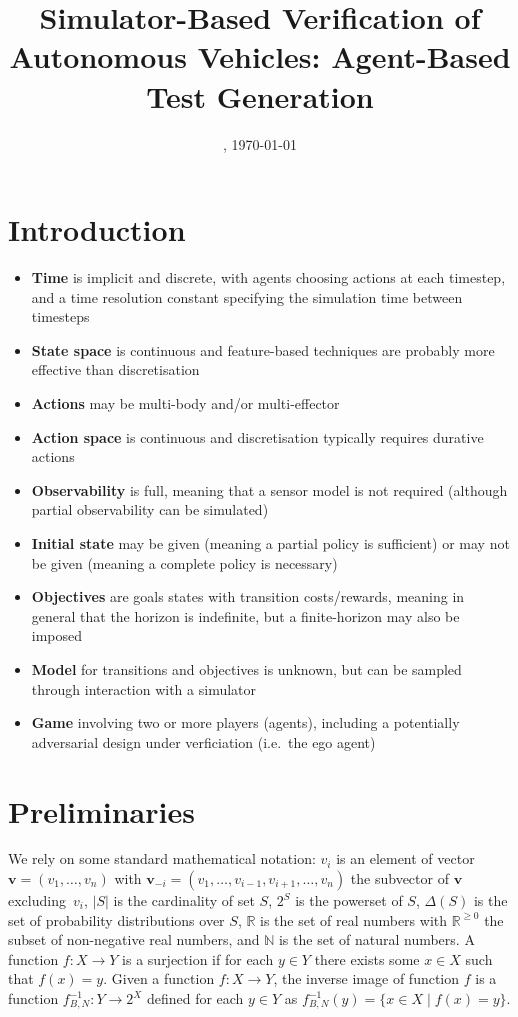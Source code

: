 \documentclass[10pt]{article}
\title{Simulator-Based Verification of Autonomous Vehicles: Agent-Based Test Generation}
\author{}
\date{\DTMcurrenttime, \today}
\theoremstyle{plain}
\newcommand{\vect}[1]{\bm{#1}}
\begin{document}
\maketitle

\section{Introduction}

\begin{itemize}
    \item \textbf{Time} is implicit and discrete, with agents choosing actions at each timestep, and a time resolution constant specifying the simulation time between timesteps
    \item \textbf{State space} is continuous and feature-based techniques are probably more effective than discretisation
    \item \textbf{Actions} may be multi-body and/or multi-effector
    \item \textbf{Action space} is continuous and discretisation typically requires durative actions
    \item \textbf{Observability} is full, meaning that a sensor model is not required (although partial observability can be simulated)
    \item \textbf{Initial state} may be given (meaning a partial policy is sufficient) or may not be given (meaning a complete policy is necessary)
    \item \textbf{Objectives} are goals states with transition costs/rewards, meaning in general that the horizon is indefinite, but a finite-horizon may also be imposed
    \item \textbf{Model} for transitions and objectives is unknown, but can be sampled through interaction with a simulator
    \item \textbf{Game} involving two or more players (agents), including a potentially adversarial design under verficiation (i.e.\ the ego agent)
\end{itemize}

\newpage
\section{Preliminaries}
We rely on some standard mathematical notation:
$v_{i}$ is an element of vector $\vect{v} = (v_{1}, \dots, v_{n})$ with $\vect{v}_{-i} = (v_{1}, \dots, v_{i-1}, v_{i+1}, \dots, v_ {n})$ the subvector of $\vect{v}$ excluding~$v_{i}$,
$|S|$ is the cardinality of set $S$,
$2^{S}$ is the powerset of $S$,
$\Delta(S)$ is the set of probability distributions over $S$,
$\mathbb{R}$ is the set of real numbers with $\mathbb{R}^{\ge 0}$ the subset of non-negative real numbers,
and $\mathbb{N}$ is the set of natural numbers.
A function $f : X \to Y$ is a surjection if for each $y \in Y$ there exists some $x \in X$ such that $f(x) = y$.
Given a function $f : X \to Y$, the inverse image of function $f$ is a function $f_{B,N}^{-1} : Y \to 2^{X}$ defined for each $y \in Y$ as $f_{B,N}^{-1}(y) = \{ x \in X \mid f(x) = y \}$.
\end{document}
